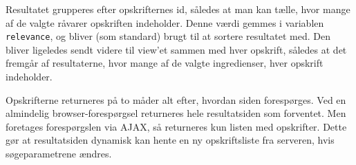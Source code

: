 Resultatet grupperes efter opskrifternes id, således at man kan tælle, hvor mange af de valgte råvarer opskriften indeholder. Denne værdi gemmes i variablen \texttt{relevance}, og bliver (som standard) brugt til at sortere resultatet med. Den bliver ligeledes sendt videre til view'et sammen med hver opskrift, således at det fremgår af resultaterne, hvor mange af de valgte ingredienser, hver opskrift indeholder.

Opskrifterne returneres på to måder alt efter, hvordan siden forespørges. Ved en almindelig browser-forespørgsel returneres hele resultatsiden som forventet. Men foretages forespørgslen via AJAX, så returneres kun listen med opskrifter. Dette gør at resultatsiden dynamisk kan hente en ny opskriftsliste fra serveren, hvis \fx søgeparametrene ændres.
